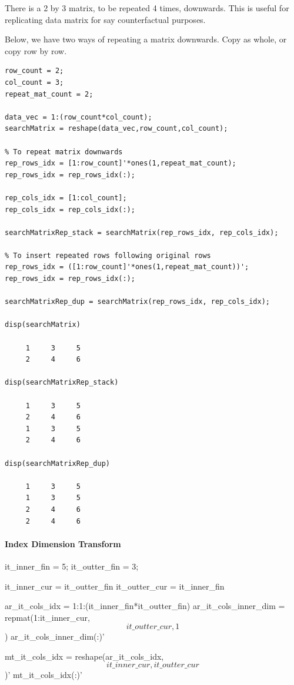 \documentclass[
]{book}
\begin{document}
There is a 2 by 3 matrix, to be repeated 4 times, downwards. This is
useful for replicating data matrix for say counterfactual purposes.

Below, we have two ways of repeating a matrix downwards. Copy as whole,
or copy row by row.

\begin{verbatim}
row_count = 2;
col_count = 3;
repeat_mat_count = 2;

data_vec = 1:(row_count*col_count);
searchMatrix = reshape(data_vec,row_count,col_count);

% To repeat matrix downwards
rep_rows_idx = [1:row_count]'*ones(1,repeat_mat_count);
rep_rows_idx = rep_rows_idx(:);

rep_cols_idx = [1:col_count];
rep_cols_idx = rep_cols_idx(:);

searchMatrixRep_stack = searchMatrix(rep_rows_idx, rep_cols_idx);

% To insert repeated rows following original rows
rep_rows_idx = ([1:row_count]'*ones(1,repeat_mat_count))';
rep_rows_idx = rep_rows_idx(:);

searchMatrixRep_dup = searchMatrix(rep_rows_idx, rep_cols_idx);

disp(searchMatrix)

     1     3     5
     2     4     6

disp(searchMatrixRep_stack)

     1     3     5
     2     4     6
     1     3     5
     2     4     6

disp(searchMatrixRep_dup)

     1     3     5
     1     3     5
     2     4     6
     2     4     6
\end{verbatim}

\hypertarget{index-dimension-transform}{%
\paragraph{Index Dimension Transform}\label{index-dimension-transform}}

it\_inner\_fin = 5; it\_outter\_fin = 3;

it\_inner\_cur = it\_outter\_fin it\_outter\_cur = it\_inner\_fin

ar\_it\_cols\_idx = 1:1:(it\_inner\_fin*it\_outter\_fin)
ar\_it\_cols\_inner\_dim = repmat(1:it\_inner\_cur, \[it\_outter\_cur,
1\]) ar\_it\_cols\_inner\_dim(:)'

mt\_it\_cols\_idx = reshape(ar\_it\_cols\_idx, \[it\_inner\_cur,
it\_outter\_cur\])' mt\_it\_cols\_idx(:)'
\end{document}

